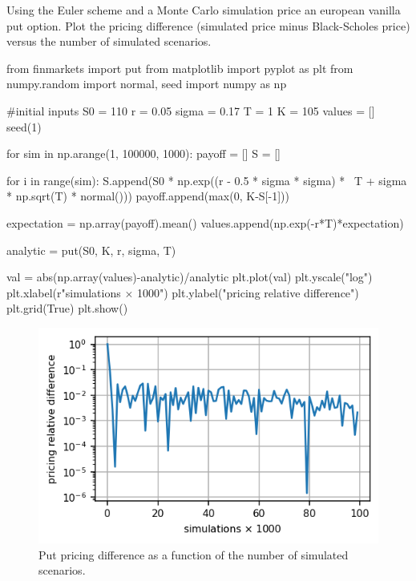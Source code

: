 \begin{question}
Using the Euler scheme and a Monte Carlo simulation price an european vanilla put option. Plot the pricing difference (simulated price minus Black-Scholes price) versus the number of simulated scenarios.
\end{question}

\cprotEnv\begin{solution}
\begin{ipython}
from finmarkets import put
from matplotlib import pyplot as plt
from numpy.random import normal, seed
import numpy as np

#initial inputs
S0 = 110
r = 0.05
sigma = 0.17
T = 1 
K = 105
values = []
seed(1)

for sim in np.arange(1, 100000, 1000):
	payoff = []
	S = []

	for i in range(sim):
		S.append(S0 * np.exp((r - 0.5 * sigma * sigma) * \
		         T + sigma * np.sqrt(T) * normal()))
		payoff.append(max(0, K-S[-1]))

	expectation = np.array(payoff).mean()
	values.append(np.exp(-r*T)*expectation)

analytic = put(S0, K, r, sigma, T)

val = abs(np.array(values)-analytic)/analytic
plt.plot(val)
plt.yscale("log")
plt.xlabel(r"simulations $\times$ 1000")
plt.ylabel("pricing relative difference")
plt.grid(True)
plt.show()
\end{ipython}
	
\begin{figure}[htbp]
\centering
\includegraphics[width=0.7\linewidth]{figures/ex_put_price}
\caption{Put pricing difference as a function of the number of simulated scenarios.}
\end{figure}
\end{solution}

